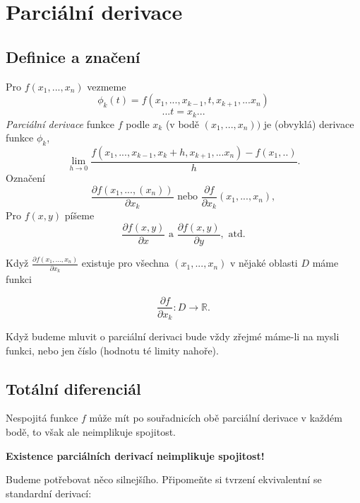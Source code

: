 \documentclass[../main.tex]{subfiles}
\begin{document}
\section{Parciální derivace}

\subsection{Definice a značení}
\hspace{1.2mm}
Pro $f(x_1,...,x_n)$ vezmeme 
\[\phi_k(t) = f(x_1,...,x_{k-1},t,x_{k+1},...x_n)\]
\[... t = x_k...\]
\hspace{1.2mm}
\textit{Parciální derivace} funkce $f$ podle $x_k$ (v bodě $(x_1,...,x_n))$ je (obvyklá) derivace funkce $\phi_k$,
\[\lim_{h\rightarrow 0}\frac{f(x_1,...,x_{k-1},x_k+h,x_{k+1},...x_n) - f(x_1,..)}{h}.\]
\hspace{1.2mm}
Označení
\[\frac{\partial f(x_1,...,(x_n))}{\partial x_k} \textrm{ nebo } \frac{\partial f}{\partial x_k} (x_1,...,x_n),\]
\hspace{1.2mm}
Pro $f(x,y)$ píšeme
\[\frac{\partial f(x,y)}{\partial x} \textrm{ a } \frac{\partial f(x,y)}{\partial y}, \textrm{ atd.}\]

\noindent
\hspace{1.2mm}
Když $\frac{\partial f(x_1,...,x_n)}{\partial x_k}$ existuje pro všechna $(x_1,...,x_n)$ v nějaké oblasti $D$ máme funkci

\[\frac{\partial f}{\partial x_k}: D \rightarrow \mathbb{R}.\]

\noindent
\hspace{1.2mm}
Když budeme mluvit o parciální derivaci bude vždy zřejmé máme-li na mysli funkci, nebo jen číslo (hodnotu té limity nahoře).
\noindent

\subsection{Totální diferenciál}
\hspace{1.2mm}
Nespojitá funkce $f$ může mít po souřadnicích obě parciální derivace v každém bodě, to však ale neimplikuje spojitost.
\begin{center}
    \textbf{Existence parciálních derivací neimplikuje spojitost!}
\end{center}
\hspace{1.2mm}
Budeme potřebovat něco silnejšího. Připomeňte si tvrzení ekvivalentní se standardní derivací:
\end{document}
